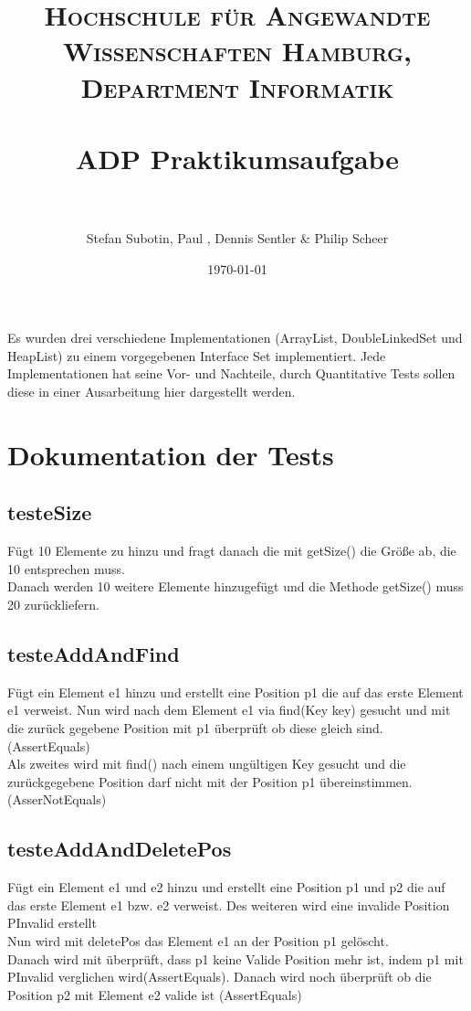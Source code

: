 \documentclass[paper=a4, fontsize=11pt]{scrartcl} %
\title{	
\normalfont \normalsize 
\textsc{Hochschule f\"ur Angewandte Wissenschaften Hamburg, Department Informatik} \\ [25pt] %
\horrule{0.5pt} \\[0.4cm] %
\huge ADP Praktikumsaufgabe \\ %
\horrule{2pt} \\[0.5cm] %
}
\author{Stefan Subotin, Paul , Dennis Sentler & Philip Scheer} %
\date{\normalsize\today} %
\numberwithin{equation}{section} %
\numberwithin{figure}{section} %
\numberwithin{table}{section} %
\begin{document}
\maketitle %
Es wurden drei verschiedene Implementationen (ArrayList, DoubleLinkedSet und HeapList)  zu einem vorgegebenen Interface Set implementiert. \newline
Jede Implementationen hat seine Vor- und Nachteile, durch Quantitative Tests sollen diese in einer Ausarbeitung hier dargestellt werden.



\section{Dokumentation der Tests}

\subsection{testeSize}
Fügt 10 Elemente zu hinzu und fragt danach die mit getSize() die Größe ab, die 10 entsprechen muss. \\
Danach werden 10 weitere Elemente hinzugefügt und die Methode getSize() muss 20 zurückliefern.

\subsection{testeAddAndFind}
Fügt ein Element e1 hinzu und erstellt eine Position p1 die auf das erste Element e1 verweist. Nun wird nach dem Element e1 via find(Key key) gesucht und mit die zurück gegebene Position mit p1 überprüft ob diese gleich sind. (AssertEquals) \\
Als zweites wird mit find() nach einem ungültigen Key gesucht und die zurückgegebene Position darf nicht mit der Position p1 übereinstimmen. (AsserNotEquals)

\subsection{testeAddAndDeletePos}
Fügt ein Element e1 und e2 hinzu und erstellt eine Position p1 und p2 die auf das erste Element e1 bzw. e2 verweist. Des weiteren wird eine invalide Position PInvalid erstellt\\
Nun wird mit deletePos das Element e1 an der Position p1 gelöscht.\\
Danach wird mit überprüft, dass p1 keine Valide Position mehr ist, indem p1 mit PInvalid verglichen wird(AssertEquals). Danach wird noch überprüft ob die Position p2 mit Element e2 valide ist (AssertEquals)
\end{document}
